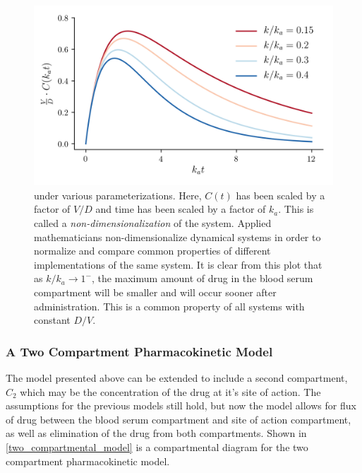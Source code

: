 \begin{figure}[h!]
	\centering
	\includegraphics{Figures/pkcureves.png}
	\caption[Non-dimensionalized solutions to pharmacokinetic differential equation]{ under various parameterizations.  Here, $ C(t) $ has been scaled by a factor of $ V/D $ and time has been scaled by a factor of $ k_a $.  This is called a \textit{non-dimensionalization} of the system.  Applied mathematicians non-dimensionalize dynamical systems in order to normalize and compare common properties of different implementations of the same system.  It is clear from this plot that as $ k/k_a \rightarrow 1^- $, the maximum amount of drug in the blood serum compartment will be smaller and will occur sooner after administration.  This is a common property of all systems with constant $D/V$. }
	\label{fig:pkcureves}
\end{figure}


\subsubsection{A Two Compartment Pharmacokinetic Model}

The model presented above can be extended to include a second compartment, $C_2$ which may be the concentration of the drug at it's site of action.  The assumptions for the previous models still hold, but now the model allows for flux of drug between the blood serum compartment and site of action compartment, as well as elimination of the drug from both compartments. Shown in \cref{two_compartmental_model} is a compartmental diagram for the two compartment pharmacokinetic model.

